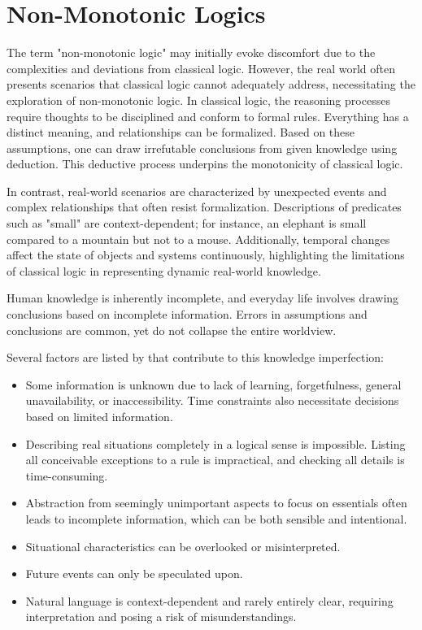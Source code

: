 \section{Non-Monotonic Logics}
The term "non-monotonic logic" may initially evoke discomfort due to the complexities and deviations from classical logic.
However, the real world often presents scenarios that classical logic cannot adequately address, necessitating the exploration of non-monotonic logic.
In classical logic, the reasoning processes require thoughts to be disciplined and conform to formal rules.
Everything has a distinct meaning, and relationships can be formalized. Based on these assumptions, one can draw irrefutable conclusions from given knowledge using deduction.
This deductive process underpins the monotonicity of classical logic.

In contrast, real-world scenarios are characterized by unexpected events and complex relationships that often resist formalization.
Descriptions of predicates such as "small" are context-dependent; for instance, an elephant is small compared to a mountain but not to a mouse.
Additionally, temporal changes affect the state of objects and systems continuously, highlighting the limitations of classical logic in representing dynamic real-world knowledge.

Human knowledge is inherently incomplete, and everyday life involves drawing conclusions based on incomplete information.
Errors in assumptions and conclusions are common, yet do not collapse the entire worldview.

Several factors are listed by \cite{beierle_methoden_2019} that contribute to this knowledge imperfection:
\begin{itemize}
    \item Some information is unknown due to lack of learning, forgetfulness, general unavailability, or inaccessibility.
          Time constraints also necessitate decisions based on limited information.
    \item Describing real situations completely in a logical sense is impossible.
          Listing all conceivable exceptions to a rule is impractical, and checking all details is time-consuming.
    \item Abstraction from seemingly unimportant aspects to focus on essentials often leads to incomplete information, which can be both sensible and intentional.
    \item Situational characteristics can be overlooked or misinterpreted.
    \item Future events can only be speculated upon.
    \item Natural language is context-dependent and rarely entirely clear, requiring interpretation and posing a risk of misunderstandings.
\end{itemize}

